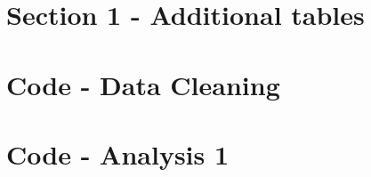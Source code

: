 \documentclass[hidelinks,12pts]{article}
\DeclareMathOperator{\1}{\mathbbm{1}}
\begin{document}
    



\newpage
\begin{appendices}

    \section*{Section 1 - Additional tables} \label{sec:BIC_tables}
    

    

    

    

    

    

    
    \section{Code - Data Cleaning} \label{sec:dta_clean}
        

    \section{Code - Analysis 1}
        

\end{appendices}
\end{document}
